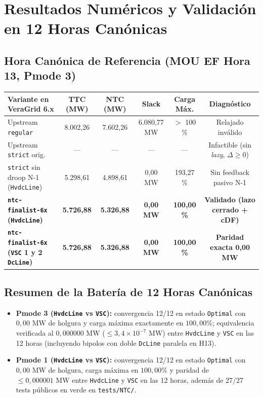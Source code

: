 \documentclass[11pt,a4paper]{article}
\begin{document}
\section{Resultados Numéricos y Validación en 12 Horas Canónicas}

\subsection{Hora Canónica de Referencia (MOU EF Hora 13, Pmode 3)}
\begin{center}
\begin{tabular}{lccccc}
\toprule
\textbf{Variante en VeraGrid 6.x} & \textbf{TTC (MW)} & \textbf{NTC (MW)} & \textbf{Slack} & \textbf{Carga Máx.} & \textbf{Diagnóstico} \\
\midrule
Upstream \texttt{regular} & 8.002,26 & 7.602,26 & 6.080,77 MW & $>$ 100 \% & Relajado inválido \\
Upstream \texttt{strict} orig. & --- & --- & --- & --- & Infactible (sin \textit{lazy}, $\Delta\ge 0$) \\
\texttt{strict} sin droop N-1 (\texttt{HvdcLine}) & 5.298,61 & 4.898,61 & 0,00 MW & 193,27 \% & Sin feedback pasivo N-1 \\
\textbf{\texttt{ntc-finalist-6x} (\texttt{HvdcLine})} & \textbf{5.726,88} & \textbf{5.326,88} & \textbf{0,00 MW} & \textbf{100,00 \%} & \textbf{Validado (lazo cerrado + cDF)} \\
\textbf{\texttt{ntc-finalist-6x} (\texttt{VSC} 1 y 2 \texttt{DcLine})} & \textbf{5.726,88} & \textbf{5.326,88} & \textbf{0,00 MW} & \textbf{100,00 \%} & \textbf{Paridad exacta 0,00 MW} \\
\bottomrule
\end{tabular}
\end{center}

\subsection{Resumen de la Batería de 12 Horas Canónicas}
\begin{itemize}
    \item \textbf{Pmode 3 (\texttt{HvdcLine} vs \texttt{VSC}):} convergencia 12/12 en estado \texttt{Optimal} con $0{,}00\text{ MW}$ de holgura y carga máxima exactamente en $100{,}00\%$; equivalencia verificada al $0{,}000000\text{ MW}$ ($\le 3{,}4\times 10^{-7}\text{ MW}$) entre \texttt{HvdcLine} y \texttt{VSC} en las 12 horas (incluyendo bipolos con doble \texttt{DcLine} paralela en H13).
    \item \textbf{Pmode 1 (\texttt{HvdcLine} vs \texttt{VSC}):} convergencia 12/12 en estado \texttt{Optimal} con $0{,}00\text{ MW}$ de holgura, carga máxima en $100{,}00\%$ y paridad de $\le 0{,}000001\text{ MW}$ entre \texttt{HvdcLine} y \texttt{VSC} en las 12 horas, además de 27/27 tests públicos en verde en \texttt{tests/NTC/}.
\end{itemize}
\end{document}
